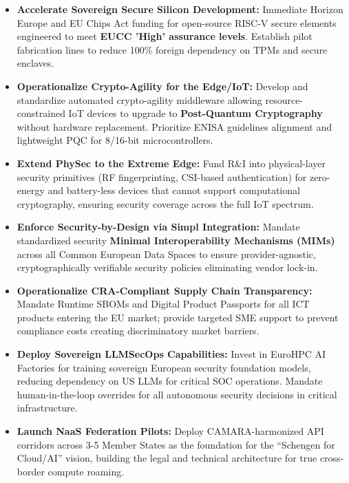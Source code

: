 \documentclass[12pt,a4paper]{article}
\begin{document}
\begin{itemize}
    \item \textbf{Accelerate Sovereign Secure Silicon Development:} Immediate Horizon Europe and EU Chips Act funding for open-source RISC-V secure elements engineered to meet \textbf{EUCC 'High' assurance levels}. Establish pilot fabrication lines to reduce 100\% foreign dependency on TPMs and secure enclaves.
    
    \item \textbf{Operationalize Crypto-Agility for the Edge/IoT:} Develop and standardize automated crypto-agility middleware allowing resource-constrained IoT devices to upgrade to \textbf{Post-Quantum Cryptography} without hardware replacement. Prioritize ENISA guidelines alignment and lightweight PQC for 8/16-bit microcontrollers.
    
    \item \textbf{Extend PhySec to the Extreme Edge:} Fund R\&I into physical-layer security primitives (RF fingerprinting, CSI-based authentication) for zero-energy and battery-less devices that cannot support computational cryptography, ensuring security coverage across the full IoT spectrum.
    
    \item \textbf{Enforce Security-by-Design via Simpl Integration:} Mandate standardized security \textbf{Minimal Interoperability Mechanisms (MIMs)} across all Common European Data Spaces to ensure provider-agnostic, cryptographically verifiable security policies eliminating vendor lock-in.
    
    \item \textbf{Operationalize CRA-Compliant Supply Chain Transparency:} Mandate Runtime SBOMs and Digital Product Passports for all ICT products entering the EU market; provide targeted SME support to prevent compliance costs creating discriminatory market barriers.
    
    \item \textbf{Deploy Sovereign LLMSecOps Capabilities:} Invest in EuroHPC AI Factories for training sovereign European security foundation models, reducing dependency on US LLMs for critical SOC operations. Mandate human-in-the-loop overrides for all autonomous security decisions in critical infrastructure.
    
    \item \textbf{Launch NaaS Federation Pilots:} Deploy CAMARA-harmonized API corridors across 3-5 Member States as the foundation for the ``Schengen for Cloud/AI'' vision, building the legal and technical architecture for true cross-border compute roaming.
    

\end{itemize}
\end{document}
